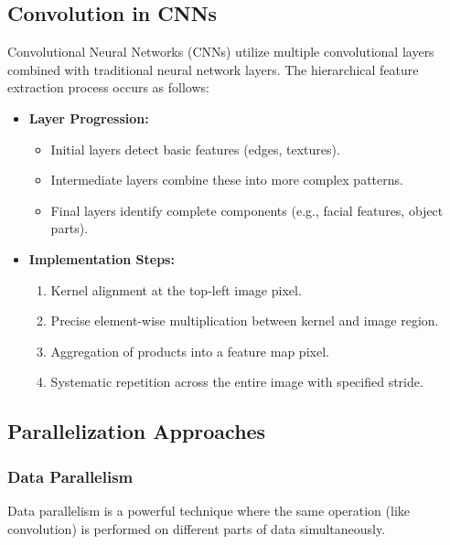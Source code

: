\documentclass[conference, 10pt]{IEEEtran}
\begin{document}
\subsection{Convolution in CNNs}
Convolutional Neural Networks (CNNs) utilize multiple convolutional layers combined with traditional neural network layers. The hierarchical feature extraction process occurs as follows:

\begin{itemize}
    \item \textbf{Layer Progression:}
    \begin{itemize}
        \item Initial layers detect basic features (edges, textures).
        \item Intermediate layers combine these into more complex patterns.
        \item Final layers identify complete components (e.g., facial features, object parts).
    \end{itemize}
    \item \textbf{Implementation Steps:}
    \begin{enumerate}
        \item Kernel alignment at the top-left image pixel.
        \item Precise element-wise multiplication between kernel and image region.
        \item Aggregation of products into a feature map pixel.
        \item Systematic repetition across the entire image with specified stride.
    \end{enumerate}
\end{itemize}

\subsection{Parallelization Approaches}
\subsubsection{Data Parallelism}
Data parallelism is a powerful technique where the same operation (like convolution) is performed on different parts of data simultaneously.
\end{document}
